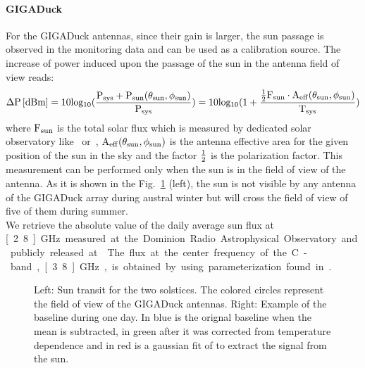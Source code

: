 \paragraph{GIGADuck}
For the GIGADuck antennas, since their gain is larger, the sun passage is observed in the monitoring data and can be used as a calibration source.  The increase  of power induced upon the passage of the sun in the antenna field of view reads:
\begin{equation}
  \rm       \unit[\Delta      P]{[dBm]}       =       10      log_{10}
  (\frac{P_{sys} + P_{sun}(\theta_{sun},\phi_{sun})  }{P_{sys}} )  = 10
  log_{10}     (    1     +     \frac{    \frac{1}{2}F_{sun}     \cdot
    A_{eff}(\theta_{sun},\phi_{sun}) } {T_{sys}} )
  \label{eq:deltaP}
\end{equation}
where    $\rm   F_{sun}$    is    the   total    solar   flux which is measured by dedicated solar observatory like~\cite{sundata} or~\cite{nobeyama},    $\rm A_{eff}(\theta_{sun},\phi_{sun}) $ is the antenna effective area for the given position of the sun in  the sky and the factor $\rm \frac{1}{2}$ is  the polarization factor.  This measurement can be performed only when the sun is  in the field  of view of  the antenna. As  it is shown  in the
Fig.~\ref{fig:sunsim} (left), the sun  is not visible by any antenna of the  GIGADuck array  during austral winter  but will cross  the field of view of five of them during summer.\\ We  retrieve the absolute value of  the daily average sun    flux   at   \unit[2.8]{GHz}    measured at the Dominion Radio Astrophysical Observatory and publicly released at~\cite{sundata}.  The  flux at the  center frequency of  the C-band, \unit[3.8]{GHz},   is  obtained   by   using  parameterization   found in~\cite{sunparam, sunparam2}. 
\begin{figure}[!ht]
 \centering
 \hspace*{-3ex}
 \caption{Left: Sun transit for the two solstices. The colored circles
   represent  the field  of  view of  the  GIGADuck antennas.   Right:
   Example  of the  baseline during  one  day. In  blue is  the
   orignal baseline when the mean is subtracted, in green after it was
   corrected from temperature dependence and  in red is a gaussian fit
   of to extract the signal from the sun.}
 \label{fig:sunsim}
\end{figure}
